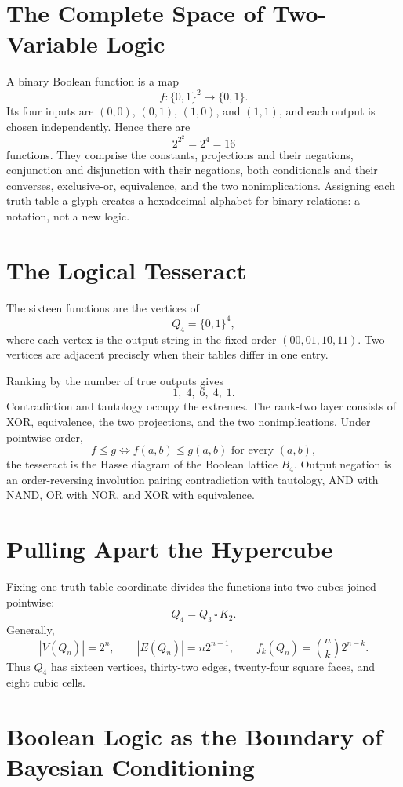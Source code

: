 \documentclass[11pt]{article}
\begin{document}
\section{The Complete Space of Two-Variable Logic}

A binary Boolean function is a map
\[
f:\{0,1\}^2\rightarrow\{0,1\}.
\]
Its four inputs are $(0,0)$, $(0,1)$, $(1,0)$, and $(1,1)$, and each output is chosen independently. Hence there are
\[
2^{2^2}=2^4=16
\]
functions. They comprise the constants, projections and their negations, conjunction and disjunction with their negations, both conditionals and their converses, exclusive-or, equivalence, and the two nonimplications. Assigning each truth table a glyph creates a hexadecimal alphabet for binary relations: a notation, not a new logic.

\section{The Logical Tesseract}

The sixteen functions are the vertices of
\[
Q_4=\{0,1\}^4,
\]
where each vertex is the output string in the fixed order $(00,01,10,11)$. Two vertices are adjacent precisely when their tables differ in one entry.

Ranking by the number of true outputs gives
\[
1,\;4,\;6,\;4,\;1.
\]
Contradiction and tautology occupy the extremes. The rank-two layer consists of XOR, equivalence, the two projections, and the two nonimplications. Under pointwise order,
\[
f\leq g\Longleftrightarrow f(a,b)\leq g(a,b)\text{ for every }(a,b),
\]
the tesseract is the Hasse diagram of the Boolean lattice $B_4$. Output negation is an order-reversing involution pairing contradiction with tautology, AND with NAND, OR with NOR, and XOR with equivalence.

\section{Pulling Apart the Hypercube}

Fixing one truth-table coordinate divides the functions into two cubes joined pointwise:
\[
Q_4=Q_3\,\square\,K_2.
\]
Generally,
\[
|V(Q_n)|=2^n,\qquad |E(Q_n)|=n2^{n-1},\qquad
f_k(Q_n)=\binom{n}{k}2^{n-k}.
\]
Thus $Q_4$ has sixteen vertices, thirty-two edges, twenty-four square faces, and eight cubic cells.

\section{Boolean Logic as the Boundary of Bayesian Conditioning}
\end{document}
